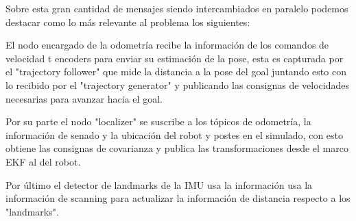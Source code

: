 Sobre esta gran cantidad de mensajes siendo intercambiados en paralelo podemos destacar como lo más relevante al problema los siguientes:

El nodo encargado de la odometría recibe la información de los comandos de velocidad t encoders para enviar su estimación de la pose, esta es capturada por el "trajectory follower" que mide la distancia a la pose del goal juntando esto con lo recibido por el "trajectory generator" y publicando las consignas de velocidades necesarias para avanzar hacia el goal.

Por su parte el nodo "localizer" se suscribe a los tópicos de odometría, la información de senado y la ubicación del robot y postes en el simulado, con esto obtiene las consignas de covarianza y publica las transformaciones desde el marco EKF al del robot.

Por último el detector de landmarks de la IMU usa la información usa la información de scanning para actualizar la información de distancia respecto a los "landmarks".